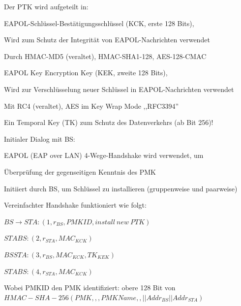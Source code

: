 \documentclass[a4paper]{article}
\begin{document}
\begin{multicols}{3}
\begin{itemize*}
\begin{itemize*}
            \end{itemize*}
            \item Der PTK wird aufgeteilt in:
            \begin{itemize*}
                  \item EAPOL-Schlüssel-Bestätigungsschlüssel (KCK, erste 128 Bits),
                  \begin{itemize*}
                        \item Wird zum Schutz der Integrität von EAPOL-Nachrichten verwendet
                        \item Durch HMAC-MD5 (veraltet), HMAC-SHA1-128, AES-128-CMAC
                  \end{itemize*}
                  \item EAPOL Key Encryption Key (KEK, zweite 128 Bits),
                  \begin{itemize*}
                        \item Wird zur Verschlüsselung neuer Schlüssel in EAPOL-Nachrichten verwendet
                        \item Mit RC4 (veraltet), AES im Key Wrap Mode ,,RFC3394''
                  \end{itemize*}
                  \item Ein Temporal Key (TK) zum Schutz des Datenverkehrs (ab Bit 256)!
            \end{itemize*}
            \item Initialer Dialog mit BS:
            \begin{itemize*}
                  \item EAPOL (EAP over LAN) 4-Wege-Handshake wird verwendet, um
                  \begin{itemize*}
                        \item Überprüfung der gegenseitigen Kenntnis des PMK
                        \item Initiiert durch BS, um Schlüssel zu installieren (gruppenweise und paarweise)
                  \end{itemize*}
                  \item Vereinfachter Handshake funktioniert wie folgt:
                  \begin{enumerate*}
                        \item $BS\rightarrow STA: (1, r_{BS} , PMKID, install\ new\ PTK)$
                        \item $STA BS: (2, r_{STA}, MAC_{KCK})$
                        \item $BS STA: (3, r_{BS}, MAC_{KCK}, {TK}_{KEK})$
                        \item $STA BS: (4, r_{STA}, MAC_{KCK})$
                  \end{enumerate*}
                  \item Wobei PMKID den PMK identifiziert: obere 128 Bit von $HMAC-SHA-256(PMK, ,,PMK Name,, || Addr_{BS} || Addr_{STA} )$
            \end{itemize*}
      \end{itemize*}


\end{multicols}
\end{document}
